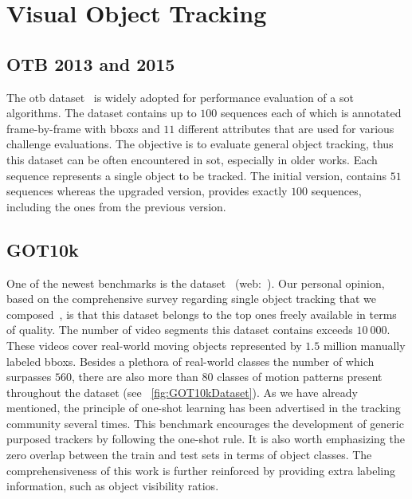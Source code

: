 \section{Visual Object Tracking}

\subsection{OTB 2013 and 2015}
\label{ssec:OTB20132015Dataset}

The \gls{otb} dataset~\cite{wu2015otb} is widely adopted for performance evaluation of a \gls{sot} algorithms. The dataset contains up to $100$ sequences each of which is annotated frame-by-frame with \glspl{bbox} and $11$ different attributes that are used for various challenge evaluations. The objective is to evaluate general object tracking, thus this dataset can be often encountered in \gls{sot}, especially in older works. Each sequence represents a single object to be tracked. The initial version, \otbthirteen{} contains $51$ sequences whereas the upgraded version, \otbfifteen{} provides exactly $100$ sequences, including the ones from the previous version.

\subsection{GOT10k}
\label{ssec:GOT10kDataset}

One of the newest benchmarks is the \gottenk{} dataset~\cite{huang2021got10k} (web:~\cite{webgot10kdataset}). Our personal opinion, based on the comprehensive survey regarding single object tracking that we composed~\cite{ondrasovic2021siamese}, is that this dataset belongs to the top ones freely available in terms of quality. The number of video segments this dataset contains exceeds $10\ 000$. These videos cover real-world moving objects represented by $1.5$ million manually labeled \glspl{bbox}. Besides a plethora of real-world classes the number of which surpasses $560$, there are also more than $80$ classes of motion patterns present throughout the dataset (see \figstr{}~\ref{fig:GOT10kDataset}).
As we have already mentioned, the principle of one-shot learning has been advertised in the tracking community several times. This benchmark encourages the development of generic purposed trackers by following the one-shot rule. It is also worth emphasizing the zero overlap between the train and test sets in terms of object classes. The comprehensiveness of this work is further reinforced by providing extra labeling information, such as object visibility ratios.


